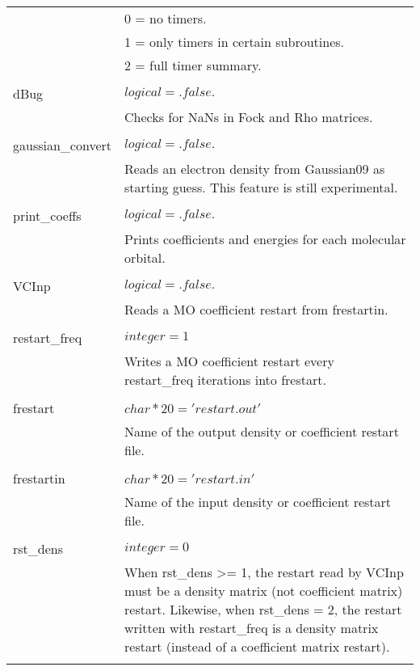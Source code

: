 \begin{Spacing}{1.0}
\begin{longtable}{ p{} p{} }
      &     0 = no timers. \\
      &     1 = only timers in certain subroutines. \\
      &     2 = full timer summary. \\
      \\
      dBug   & $ logical = .false. $\\
      & Checks for NaNs in Fock and Rho matrices.\\
      \\
      gaussian\_convert & $ logical = .false. $ \\
      & Reads an electron density from Gaussian09 as starting guess. 
      This feature is still experimental. \\
      \\
      print\_coeffs   & $ logical = .false. $\\
      & Prints coefficients and energies for each molecular orbital. \\
      \\      
      VCInp & $ logical = .false. $ \\
      & Reads a MO coefficient restart from frestartin.\\
      \\
      restart\_freq & $ integer = 1 $ \\
      & Writes a MO coefficient restart every restart\_freq iterations into 
      frestart.\\
      \\
      frestart & $ char*20 = 'restart.out' $ \\
      & Name of the output density or coefficient restart file. \\
      \\
      frestartin & $ char*20 = 'restart.in' $ \\
      & Name of the input density or coefficient restart file. \\
      \\
      rst\_dens & $ integer = 0 $ \\
      & When rst\_dens >= 1, the restart read by VCInp must be a density
      matrix (not coefficient matrix) restart. Likewise, when rst\_dens = 2,
      the restart written with restart\_freq is a density matrix restart
      (instead of a coefficient matrix restart). \\
      \\
   \end{longtable}
\end{Spacing}


